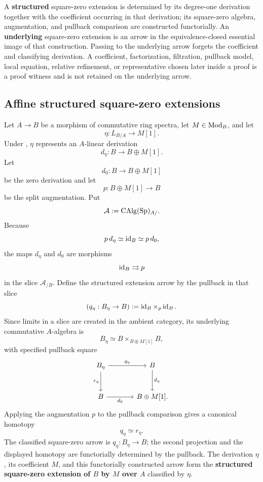 \begin{convention}
\label{conv:structured-underlying-infinitesimal}
A \textbf{structured} square-zero extension is determined by its degree-one
derivation together with the coefficient occurring in that derivation; its
square-zero algebra, augmentation, and pullback comparison are constructed
functorially. An \textbf{underlying} square-zero extension is an arrow in the
equivalence-closed essential image of that construction. Passing to the
underlying arrow forgets the coefficient and classifying derivation. A
coefficient, factorization, filtration, pullback model, local equation,
relative refinement, or representative chosen later inside a proof is a proof
witness and is not retained on the underlying arrow.
\end{convention}

\subsection{Affine structured square-zero extensions}

\begin{construction}
\label{con:structured-square-zero-extension}
Let \(A\to B\) be a morphism of commutative ring spectra, let
\(M\in\operatorname{Mod}_B\), and let
\[
    \eta:L_{B/A}\longrightarrow M[1].
\]
Under , \(\eta\) represents an
\(A\)-linear derivation
\[
    d_\eta:B\longrightarrow B\oplus M[1].
\]
Let
\[
    d_0:B\longrightarrow B\oplus M[1]
\]
be the zero derivation and let
\[
    p:B\oplus M[1]\longrightarrow B
\]
be the split augmentation. Put
\[
    \mathcal A:=\operatorname{CAlg}(\operatorname{Sp})_{A/}.
\]
Because
\[
    p\,d_\eta\simeq\operatorname{id}_B\simeq p\,d_0,
\]
the maps \(d_\eta\) and \(d_0\) are morphisms
\[
    \operatorname{id}_B\rightrightarrows p
\]
in the slice \(\mathcal A_{/B}\). Define the structured extension arrow by
the pullback in that slice
\[
    (q_\eta:B_\eta\to B)
    :=
    \operatorname{id}_B\times_p\operatorname{id}_B.
\]
Since limits in a slice are created in the ambient category, its underlying
commutative \(A\)-algebra is
\[
    B_\eta
    \simeq
    B\times_{B\oplus M[1]}B,
\]
with specified pullback square
\[
\begin{tikzcd}[column sep=large, row sep=large]
    B_\eta \arrow[r,"q_\eta"] \arrow[d,"r_\eta"']
        & B \arrow[d,"d_\eta"]
    \\
    B \arrow[r,"d_0"']
        & B\oplus M[1].
\end{tikzcd}
\]
Applying the augmentation \(p\) to the pullback comparison gives a canonical
homotopy
\[
    q_\eta\simeq r_\eta.
\]
The classified square-zero arrow is \(q_\eta:B_\eta\to B\); the second
projection and the displayed homotopy are functorially determined by the
pullback. The derivation \(\eta\), its coefficient \(M\), and this
functorially constructed arrow form the
\textbf{structured square-zero extension of \(B\) by \(M\) over \(A\)}
classified by \(\eta\).
\end{construction}

